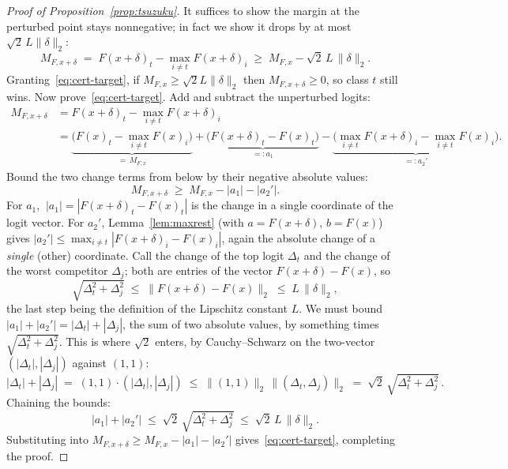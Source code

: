 \begin{proof}[Proof of Proposition~\ref{prop:tsuzuku}]
It suffices to show the margin at the perturbed point stays nonnegative; in fact we show it drops by at most $\sqrt2\,L\|\delta\|_2$:
\begin{equation}
  \label{eq:cert-target}
  M_{F,x+\delta} \;=\; F(x+\delta)_t - \max_{i\neq t}F(x+\delta)_i
  \;\ge\; M_{F,x} - \sqrt2\,L\,\|\delta\|_2 .
\end{equation}
Granting~\eqref{eq:cert-target}, if $M_{F,x}\ge\sqrt2 L\|\delta\|_2$ then $M_{F,x+\delta}\ge0$, so class $t$ still wins. Now prove~\eqref{eq:cert-target}. Add and subtract the unperturbed logits:
\begin{align*}
  M_{F,x+\delta}
   &= F(x+\delta)_t - \max_{i\neq t}F(x+\delta)_i \\
   &= \underbrace{\big(F(x)_t - \max_{i\neq t}F(x)_i\big)}_{=\,M_{F,x}}
      + \underbrace{\big(F(x+\delta)_t - F(x)_t\big)}_{=:a_1}
      - \underbrace{\big(\max_{i\neq t}F(x+\delta)_i - \max_{i\neq t}F(x)_i\big)}_{=:a_2'} .
\end{align*}
Bound the two change terms from below by their negative absolute values:
\[
  M_{F,x+\delta} \;\ge\; M_{F,x} - |a_1| - |a_2'| .
\]
For $a_1$, $\ |a_1| = |F(x+\delta)_t - F(x)_t|$ is the change in a single coordinate of the logit vector. For $a_2'$, Lemma~\ref{lem:maxrest} (with $a=F(x+\delta)$, $b=F(x)$) gives $|a_2'|\le\max_{i\neq t}|F(x+\delta)_i - F(x)_i|$, again the absolute change of a \emph{single} (other) coordinate. Call the change of the top logit $\Delta_t$ and the change of the worst competitor $\Delta_j$; both are entries of the vector $F(x+\delta)-F(x)$, so
\[
  \sqrt{\Delta_t^2 + \Delta_j^2} \;\le\; \big\|F(x+\delta)-F(x)\big\|_2 \;\le\; L\,\|\delta\|_2 ,
\]
the last step being the definition of the Lipschitz constant $L$. We must bound $|a_1|+|a_2'| = |\Delta_t|+|\Delta_j|$, the sum of two absolute values, by something times $\sqrt{\Delta_t^2+\Delta_j^2}$. This is where $\sqrt2$ enters, by Cauchy--Schwarz on the two-vector $(|\Delta_t|,|\Delta_j|)$ against $(1,1)$:
\[
  |\Delta_t| + |\Delta_j|
  \;=\; (1,1)\cdot(|\Delta_t|,|\Delta_j|)
  \;\le\; \big\|(1,1)\big\|_2\,\big\|(\Delta_t,\Delta_j)\big\|_2
  \;=\; \sqrt2\,\sqrt{\Delta_t^2+\Delta_j^2}\,.
\]
Chaining the bounds:
\[
  |a_1|+|a_2'| \;\le\; \sqrt2\,\sqrt{\Delta_t^2+\Delta_j^2} \;\le\; \sqrt2\,L\,\|\delta\|_2 .
\]
Substituting into $M_{F,x+\delta}\ge M_{F,x}-|a_1|-|a_2'|$ gives~\eqref{eq:cert-target}, completing the proof.
\end{proof}

